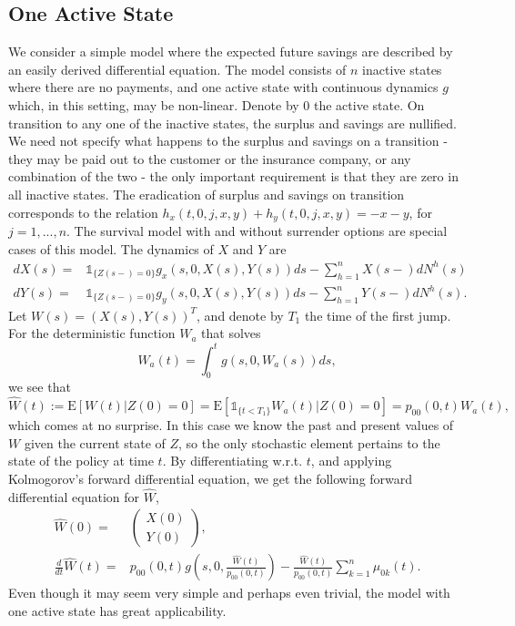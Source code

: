 \documentclass[12pt]{article}
\newcommand{\E}{\text{E}}
\newcommand{\indic}[1]{\mathds{1}_{ \{ #1 \} }}
\theoremstyle{my_thm}
\begin{document}
\subsection{One Active State}
We consider a simple model where the expected future savings are described by an easily derived differential equation. The model consists of $n$ inactive states where there are no payments, and one active state with continuous dynamics $g$ which, in this setting, may be non-linear. Denote by $0$ the active state. On transition to any one of the inactive states, the surplus and savings are nullified. We need not specify what happens to the surplus and savings on a transition - they may be paid out to the customer or the insurance company, or any combination of the two - the only important requirement is that they are zero in all inactive states. The eradication of surplus and savings on transition corresponds to the relation $h_x(t,0,j,x,y)+h_y(t,0,j,x,y)=-x-y$, for $j=1,...,n$. The survival model with and without surrender options are special cases of this model.  The dynamics of $X$ and $Y$ are
\begin{align*}
dX(s)=& \indic{Z(s-)=0} g_x(s,0,X(s),Y(s))ds - \sum_{h=1}^n X(s-)dN^h(s)
\\
dY(s)=& \indic{Z(s-)=0} g_y(s,0,X(s),Y(s))ds - \sum_{h=1}^n Y(s-)dN^h(s).
\end{align*}
Let $W(s)=(X(s),Y(s))^T$, and denote by $T_1$ the time of the first jump. For the deterministic function $W_a$ that solves
$$
W_a(t)=\int_0^t g(s,0,W_a(s)) ds,
$$
we see that
$$
\hat{W}(t):=\E[W(t)|Z(0)=0] = \E [  \indic{t<T_1} W_a(t)|Z(0)=0]  = p_{00}(0,t) W_a(t),
$$
which comes at no surprise. In this case we know the past and present values of $W$ given the current state of $Z$, so the only stochastic element pertains to the state of the policy at time $t$. By differentiating w.r.t. $t$, and applying Kolmogorov's forward differential equation, we get the following forward differential equation for $\hat{W}$,
\begin{align*}
\hat{W}(0)=&\begin{pmatrix}
X(0)\\
Y(0)
\end{pmatrix},
\\
\frac{d}{dt}\hat{W}(t)=&p_{00}(0,t) g \left( s,0,\frac{\hat{W}(t)}{p_{00}(0,t)}\right)
-
\frac{\hat{W}(t)}{p_{00}(0,t)}\sum_{k=1}^n \mu_{0k}(t).
\end{align*}
Even though it may seem very simple and perhaps even trivial, the model with one active state has great applicability.
\end{document}

